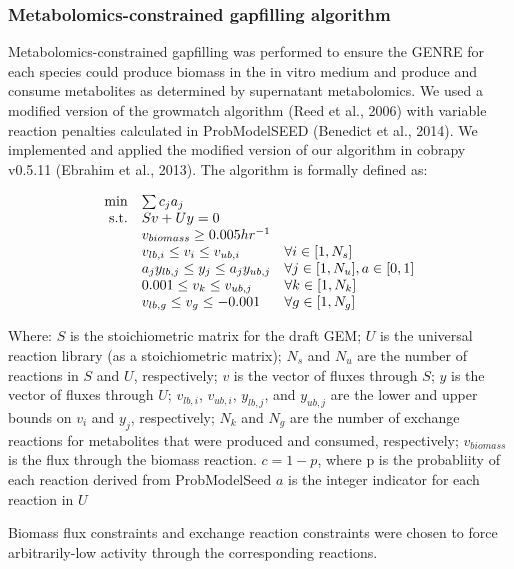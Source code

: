 \documentclass[11pt,twocolumn,notitlepage,openany,twoside]{book}
\begin{document}
\begin{refsection}
\subsubsection{Metabolomics-constrained gapfilling algorithm}

Metabolomics-constrained gapfilling was performed to ensure the GENRE for each species could produce biomass in the in vitro medium and produce and consume metabolites as determined by supernatant metabolomics. We used a modified version of the growmatch algorithm (Reed et al., 2006) with variable reaction penalties calculated in ProbModelSEED (Benedict et al., 2014). We implemented and applied the modified version of our algorithm in cobrapy v0.5.11 (Ebrahim et al., 2013). The algorithm is formally defined as:

\begin{equation*}
\begin{array}{rlll}
\min & \multicolumn{2}{l} {\sum c_{j}a_{j} } \\
\textrm{s.t.} &	Sv + Uy = 0	 \\
&	v_{biomass} \geq 0.005 hr^{-1} \\
&	v_{lb,i} \leq v_i \leq v_{ub,i}	& 	\forall i \in [1, N_s] \\
&	a_{j}y_{lb,j} \leq y_j \leq a_{j}y_{ub,j}	&	\forall j \in [1, N_u], a \in{[0,1]} \\
&	0.001 \leq v_k \leq v_{ub,j}	&	\forall k \in [1, N_k] \\
&	v_{lb,g} \leq v_g \leq -0.001	&	\forall g \in [1, N_g] \\
\end{array}
\end{equation*}

Where:
  $S$ is the stoichiometric matrix for the draft GEM;
	$U$ is the universal reaction library (as a stoichiometric matrix);
	$N_s$ and $N_u$ are the number of reactions in $S$ and $U$, respectively;
	$v$ is the vector of fluxes through $S$;
 	$y$ is the vector of fluxes through $U$;
	$v_{lb,i}$, $v_{ub,i}$, $y_{lb,j}$, and $y_{ub,j}$ are the lower and upper bounds on $v_i$ and $y_j$, respectively;
  $N_k$ and $N_g$ are the number of exchange reactions for metabolites that were produced and consumed, respectively;
	$v_{biomass}$ is the flux through the biomass reaction.
  $c = 1 - p$, where p is the probabliity of each reaction derived from ProbModelSeed
  $a$ is the integer indicator for each reaction in $U$

Biomass flux constraints and exchange reaction constraints were chosen to force arbitrarily-low activity through the corresponding reactions.


\end{refsection}
\end{document}
